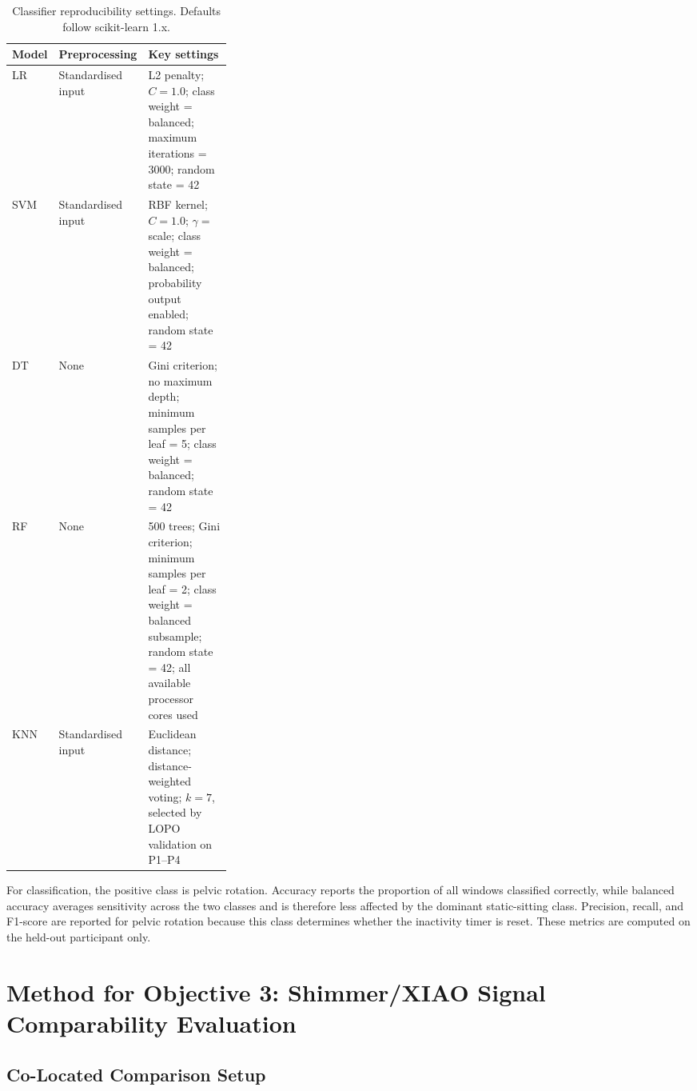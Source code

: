 \begin{table}[H]
    \centering
    \scriptsize
    \caption{Classifier reproducibility settings. Defaults follow scikit-learn 1.x.}
    \label{tab:ch6_model_settings}
    \renewcommand{\arraystretch}{1.05}
    \begin{tabularx}{\linewidth}{@{}p{0.11\linewidth}p{0.21\linewidth}X@{}}
        \toprule
        Model & Preprocessing & Key settings \\
        \midrule
        LR  & Standardised input
            & L2 penalty; \(C=1.0\); class weight = balanced; maximum iterations = 3000; random state = 42 \\
        SVM & Standardised input
            & RBF kernel; \(C=1.0\); \(\gamma=\) scale; class weight = balanced; probability output enabled; random state = 42 \\
        DT  & None
            & Gini criterion; no maximum depth; minimum samples per leaf = 5; class weight = balanced; random state = 42 \\
        RF  & None
            & 500 trees; Gini criterion; minimum samples per leaf = 2; class weight = balanced subsample; random state = 42; all available processor cores used \\
        KNN & Standardised input
            & Euclidean distance; distance-weighted voting; \(k=7\), selected by LOPO validation on P1--P4 \\
        \bottomrule
    \end{tabularx}
\end{table}

For classification, the positive class is pelvic rotation. Accuracy reports the proportion of all windows classified correctly, while balanced accuracy averages sensitivity across the two classes and is therefore less affected by the dominant static-sitting class. Precision, recall, and F1-score are reported for pelvic rotation because this class determines whether the inactivity timer is reset. These metrics are computed on the held-out participant only.

\FloatBarrier

\section{Method for Objective 3: Shimmer/XIAO Signal Comparability Evaluation}\label{sec:shimmer_validation}

\subsection{Co-Located Comparison Setup}


